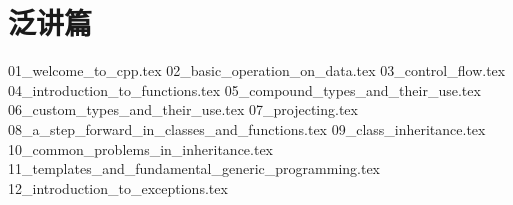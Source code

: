 \part*{泛讲篇}
{01_welcome_to_cpp.tex}
{02_basic_operation_on_data.tex}
{03_control_flow.tex}
{04_introduction_to_functions.tex}
{05_compound_types_and_their_use.tex}
{06_custom_types_and_their_use.tex}
{07_projecting.tex}
{08_a_step_forward_in_classes_and_functions.tex}
{09_class_inheritance.tex}
{10_common_problems_in_inheritance.tex}
{11_templates_and_fundamental_generic_programming.tex}
{12_introduction_to_exceptions.tex}